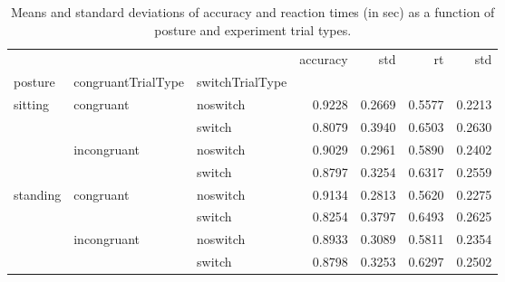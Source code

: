 \begin{table}
\centering
\caption{Means and standard deviations of accuracy and reaction times (in sec) as a function of posture and experiment trial types.}
\label{table-task-switching-replication-reaction-time}
\begin{tabular}{lllrrrr}
\toprule
         &             &        & accuracy &    std &     rt &    std \\
posture & congruantTrialType & switchTrialType &          &        &        &        \\
\midrule
sitting & congruant & noswitch &   0.9228 & 0.2669 & 0.5577 & 0.2213 \\
         &             & switch &   0.8079 & 0.3940 & 0.6503 & 0.2630 \\
         & incongruant & noswitch &   0.9029 & 0.2961 & 0.5890 & 0.2402 \\
         &             & switch &   0.8797 & 0.3254 & 0.6317 & 0.2559 \\
standing & congruant & noswitch &   0.9134 & 0.2813 & 0.5620 & 0.2275 \\
         &             & switch &   0.8254 & 0.3797 & 0.6493 & 0.2625 \\
         & incongruant & noswitch &   0.8933 & 0.3089 & 0.5811 & 0.2354 \\
         &             & switch &   0.8798 & 0.3253 & 0.6297 & 0.2502 \\
\bottomrule
\end{tabular}
\end{table}
